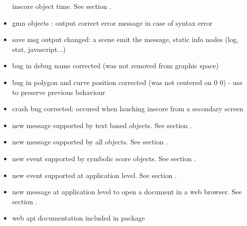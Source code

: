 \begin{itemize}
  inscore object time. See section .
\item gmn objects : output correct error message in case of syntax error
\item save msg output changed: a scene emit the  message, static info nodes (log, stat, javascript...)
\item bug in debug name corrected (was not removed from graphic space)
\item bug in polygon and curve position corrected (was not centered on 0 0) - use  
  to preserve previous behaviour
\item crash bug corrected: occured when lauching inscore from a secondary screen
\item new  message supported by text based objects. See section .
\end{itemize}

\begin{itemize}
\item new  message supported by all objects. See section .
\item new  event supported by symbolic score objects. See section .
\item new  event supported at application level. See section .
\item new  message at application level to open a document in a web browser. See section .
\item web api documentation included in package
\end{itemize}

